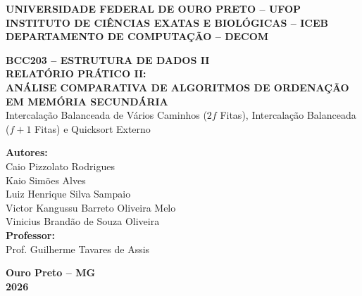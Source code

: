 \documentclass[12pt,a4paper]{article}
\begin{document}
\hypersetup{pageanchor=false}
\begin{titlepage}
    \centering
    {\large \textbf{UNIVERSIDADE FEDERAL DE OURO PRETO -- UFOP}}\\[0.2cm]
    {\large \textbf{INSTITUTO DE CIÊNCIAS EXATAS E BIOLÓGICAS -- ICEB}}\\[0.2cm]
    {\large \textbf{DEPARTAMENTO DE COMPUTAÇÃO -- DECOM}}\\[0.2cm]

    \vfill

    {\large \textbf{BCC203 -- ESTRUTURA DE DADOS II}}\\[0.6cm]

    {\LARGE \textbf{RELATÓRIO PRÁTICO II:}}\\[0.3cm]
    {\Large \textbf{ANÁLISE COMPARATIVA DE ALGORITMOS DE ORDENAÇÃO EM MEMÓRIA SECUNDÁRIA}}\\[0.4cm]
    {\large Intercalação Balanceada de Vários Caminhos ($2f$ Fitas), Intercalação Balanceada ($f+1$ Fitas) e Quicksort Externo}

    \vfill

    {\large \textbf{Autores:}}\\[0.25cm]
    Caio Pizzolato Rodrigues\\[0.15cm]
    Kaio Simões Alves\\[0.15cm]
    Luiz Henrique Silva Sampaio\\[0.15cm]
    Victor Kangussu Barreto Oliveira Melo\\[0.15cm]
    Vinicius Brandão de Souza Oliveira\\[0.8cm]

    {\large \textbf{Professor:}}\\[0.25cm]
    Prof. Guilherme Tavares de Assis

    \vfill

    {\large \textbf{Ouro Preto -- MG}}\\[0.2cm]
    {\large \textbf{2026}}
\end{titlepage}

\hypersetup{pageanchor=true}
\thispagestyle{empty}
\tableofcontents
\newpage
\end{document}
